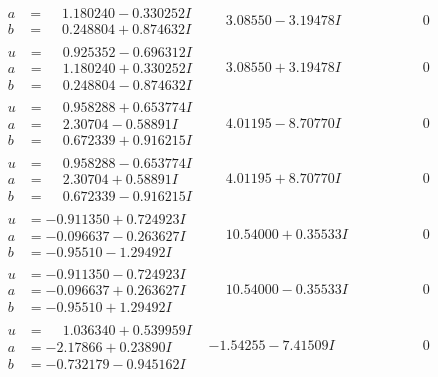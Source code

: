 \documentclass[1p]{elsarticle_modified}
\theoremstyle{definition}
\begin{document}
$$\begin{array}{c|c|c}
\begin{aligned}
a &= \phantom{-}1.180240 - 0.330252 I \\
b &= \phantom{-}0.248804 + 0.874632 I\end{aligned}
 & \phantom{-}3.08550 - 3.19478 I & \phantom{-0.000000 } 0 \\ \hline\begin{aligned}
u &= \phantom{-}0.925352 - 0.696312 I \\
a &= \phantom{-}1.180240 + 0.330252 I \\
b &= \phantom{-}0.248804 - 0.874632 I\end{aligned}
 & \phantom{-}3.08550 + 3.19478 I & \phantom{-0.000000 } 0 \\ \hline\begin{aligned}
u &= \phantom{-}0.958288 + 0.653774 I \\
a &= \phantom{-}2.30704 - 0.58891 I \\
b &= \phantom{-}0.672339 + 0.916215 I\end{aligned}
 & \phantom{-}4.01195 - 8.70770 I & \phantom{-0.000000 } 0 \\ \hline\begin{aligned}
u &= \phantom{-}0.958288 - 0.653774 I \\
a &= \phantom{-}2.30704 + 0.58891 I \\
b &= \phantom{-}0.672339 - 0.916215 I\end{aligned}
 & \phantom{-}4.01195 + 8.70770 I & \phantom{-0.000000 } 0 \\ \hline\begin{aligned}
u &= -0.911350 + 0.724923 I \\
a &= -0.096637 - 0.263627 I \\
b &= -0.95510 - 1.29492 I\end{aligned}
 & \phantom{-}10.54000 + 0.35533 I & \phantom{-0.000000 } 0 \\ \hline\begin{aligned}
u &= -0.911350 - 0.724923 I \\
a &= -0.096637 + 0.263627 I \\
b &= -0.95510 + 1.29492 I\end{aligned}
 & \phantom{-}10.54000 - 0.35533 I & \phantom{-0.000000 } 0 \\ \hline\begin{aligned}
u &= \phantom{-}1.036340 + 0.539959 I \\
a &= -2.17866 + 0.23890 I \\
b &= -0.732179 - 0.945162 I\end{aligned}
 & -1.54255 - 7.41509 I & \phantom{-0.000000 } 0 \\ \hline\begin{aligned}

\end{aligned}
\end{array}$$
\end{document}
